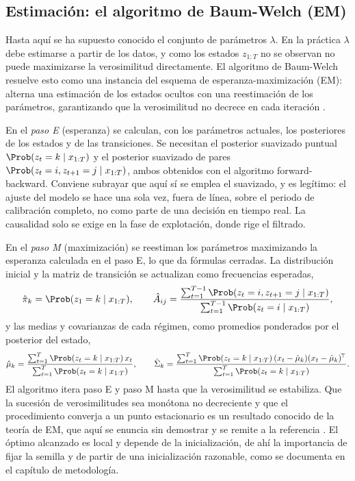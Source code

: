 \subsection{Estimación: el algoritmo de Baum-Welch (EM)}
\label{sec:hmm-em}

Hasta aquí se ha supuesto conocido el conjunto de parámetros $\lambda$. En la práctica $\lambda$ debe estimarse a partir de los datos, y como los estados $z_{1:T}$ no se observan no puede maximizarse la verosimilitud directamente. El algoritmo de Baum-Welch resuelve esto como una instancia del esquema de esperanza-maximización (EM): alterna una estimación de los estados ocultos con una reestimación de los parámetros, garantizando que la verosimilitud no decrece en cada iteración \cite{baum1970, rabiner1989}.

En el \emph{paso E} (esperanza) se calculan, con los parámetros actuales, los posteriores de los estados y de las transiciones. Se necesitan el posterior suavizado puntual $\Prob(z_t = k \mid x_{1:T})$ y el posterior suavizado de pares $\Prob(z_t = i, z_{t+1} = j \mid x_{1:T})$, ambos obtenidos con el algoritmo forward-backward. Conviene subrayar que aquí sí se emplea el suavizado, y es legítimo: el ajuste del modelo se hace una sola vez, fuera de línea, sobre el periodo de calibración completo, no como parte de una decisión en tiempo real. La causalidad solo se exige en la fase de explotación, donde rige el filtrado.

En el \emph{paso M} (maximización) se reestiman los parámetros maximizando la esperanza calculada en el paso E, lo que da fórmulas cerradas. La distribución inicial y la matriz de transición se actualizan como frecuencias esperadas,
\[
\hat{\pi}_k = \Prob(z_1 = k \mid x_{1:T}),
\qquad
\hat{A}_{ij} = \frac{\sum_{t=1}^{T-1} \Prob(z_t = i, z_{t+1} = j \mid x_{1:T})}{\sum_{t=1}^{T-1} \Prob(z_t = i \mid x_{1:T})},
\]
y las medias y covarianzas de cada régimen, como promedios ponderados por el posterior del estado,
\[
\hat{\mu}_k = \frac{\sum_{t=1}^{T} \Prob(z_t = k \mid x_{1:T})\, x_t}{\sum_{t=1}^{T} \Prob(z_t = k \mid x_{1:T})},
\qquad
\hat{\Sigma}_k = \frac{\sum_{t=1}^{T} \Prob(z_t = k \mid x_{1:T})\, (x_t - \hat{\mu}_k)(x_t - \hat{\mu}_k)^{\!\top}}{\sum_{t=1}^{T} \Prob(z_t = k \mid x_{1:T})}.
\]
El algoritmo itera paso E y paso M hasta que la verosimilitud se estabiliza. Que la sucesión de verosimilitudes sea monótona no decreciente y que el procedimiento converja a un punto estacionario es un resultado conocido de la teoría de EM, que aquí se enuncia sin demostrar y se remite a la referencia \cite{baum1970, rabiner1989}. El óptimo alcanzado es local y depende de la inicialización, de ahí la importancia de fijar la semilla y de partir de una inicialización razonable, como se documenta en el capítulo de metodología.

